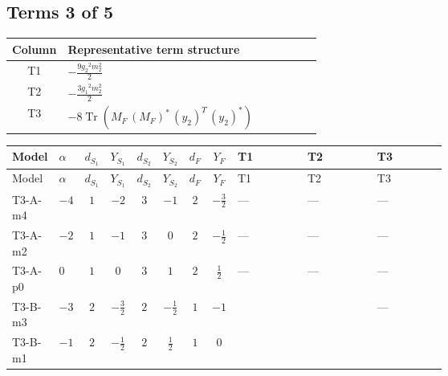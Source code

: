 \documentclass[8pt]{article}
\begin{document}
\begin{landscape}
\subsection*{Terms 3 of 5}
\begin{center}
\begin{tabular}{@{}c >{\raggedright\arraybackslash}p{0.82\linewidth}@{}}
\toprule
Column & Representative term structure \\
\midrule
T1 & \(\displaystyle -\frac{9 {g_2}^2 {m_2^2}}{2}\) \\
\midrule
T2 & \(\displaystyle -\frac{3 {g_1}^2 {m_2^2}}{2}\) \\
\midrule
T3 & \(\displaystyle -8 \operatorname{Tr}\!\left({M_F}\,\left({M_F}\right)^{*}\,\left({y_2}\right)^{T}\,\left({y_2}\right)^{*}\right)\) \\
\midrule
\bottomrule
\end{tabular}
\end{center}
\smallskip
\tiny
\begin{longtable}{@{}llcccccc >{\raggedright\arraybackslash}p{0.21\linewidth} >{\raggedright\arraybackslash}p{0.21\linewidth} >{\raggedright\arraybackslash}p{0.21\linewidth}@{}}
\toprule
Model & $\alpha$ & $d_{S_1}$ & $Y_{S_1}$ & $d_{S_2}$ & $Y_{S_2}$ & $d_F$ & $Y_F$ & T1 & T2 & T3 \\
\midrule
\endfirsthead
\toprule
Model & $\alpha$ & $d_{S_1}$ & $Y_{S_1}$ & $d_{S_2}$ & $Y_{S_2}$ & $d_F$ & $Y_F$ & T1 & T2 & T3 \\
\midrule
\endhead
T3-A-m4 & $-4$ & $1$ & $-2$ & $3$ & $-1$ & $2$ & $-\frac{3}{2}$ & --- & --- & --- \\
\midrule
T3-A-m2 & $-2$ & $1$ & $-1$ & $3$ & $0$ & $2$ & $-\frac{1}{2}$ & --- & --- & --- \\
\midrule
T3-A-p0 & $0$ & $1$ & $0$ & $3$ & $1$ & $2$ & $\frac{1}{2}$ & --- & --- & --- \\
\midrule
T3-B-m3 & $-3$ & $2$ & $-\frac{3}{2}$ & $2$ & $-\frac{1}{2}$ & $1$ & $-1$ & \scriptsize\adjustbox{max width=\linewidth}{$\begin{gathered} -\frac{9 {g_2}^2 {m_2^2}}{2}\end{gathered}$} & \scriptsize\adjustbox{max width=\linewidth}{$\begin{gathered} -\frac{3 {g_1}^2 {m_2^2}}{2}\end{gathered}$} & --- \\
\midrule
T3-B-m1 & $-1$ & $2$ & $-\frac{1}{2}$ & $2$ & $\frac{1}{2}$ & $1$ & $0$ & \scriptsize\adjustbox{max width=\linewidth}{$\begin{gathered} -\frac{9 {g_2}^2 {m_2^2}}{2}\end{gathered}$} & \scriptsize\adjustbox{max width=\linewidth}{$\begin{gathered} -\frac{3 {g_1}^2 {m_2^2}}{2}\end{gathered}$} & \scriptsize\adjustbox{max width=\linewidth}{$\begin{gathered} -8 \operatorname{Tr}\!\left({M_F}\,\left({M_F}\right)^{*}\,\left({y_2}\right)^{T}\,\left({y_2}\right)^{*}\right)\end{gathered}$} \\

\end{longtable}
\end{landscape}
\end{document}
